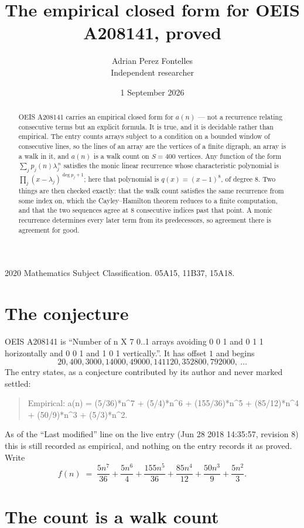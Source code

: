 \documentclass[11pt,a4paper]{article}
\title{The empirical closed form for OEIS A208141, proved}
\author{Adrian Perez Fontelles\\ \small Independent researcher}
\date{1 September 2026}
\theoremstyle{plain}
\theoremstyle{definition}
\begin{document}
\maketitle

\begin{abstract}
OEIS A208141 carries an empirical closed form for $a(n)$ --- not a recurrence relating
consecutive terms but an explicit formula. It is true, and it is decidable rather than
empirical. The entry counts arrays subject to a condition on a bounded window of consecutive lines, so the lines of an array are the
vertices of a finite digraph, an array is a walk in it, and $a(n)$ is a walk count on
$S=400$ vertices. Any function of the form $\sum_j p_j(n)\lambda_j^{\,n}$ satisfies the
monic linear recurrence whose characteristic polynomial is
$\prod_j(x-\lambda_j)^{\deg p_j+1}$; here that polynomial is $q(x)=(x-1)^{8}$, of degree
$8$. Two things are then checked exactly: that the walk count satisfies the same
recurrence from some index on, which the Cayley--Hamilton theorem reduces to a finite
computation, and that the two sequences agree at $8$ consecutive indices past that
point. A monic recurrence determines every later term from its predecessors, so agreement
there is agreement for good.
\end{abstract}

\noindent\small 2020 Mathematics Subject Classification. 05A15, 11B37, 15A18.\normalsize

\section{The conjecture}

OEIS A208141 is ``Number of n X 7 0..1 arrays avoiding 0 0 1 and 0 1 1 horizontally and 0 0 1 and 1 0 1 vertically.''. It has offset $1$ and begins
\[
20, 400, 3000, 14000, 49000, 141120, 352800, 792000,\ \dots
\]
The entry states, as a conjecture contributed by its author and never marked settled:
\begin{quote}
Empirical: a(n) = (5/36)*n\^{}7 + (5/4)*n\^{}6 + (155/36)*n\^{}5 + (85/12)*n\^{}4 + (50/9)*n\^{}3 + (5/3)*n\^{}2.
\end{quote}
As of the ``Last modified'' line on the live entry (Jun 28 2018 14:35:57, revision 8) this is still
recorded as empirical, and nothing on the entry records it as proved. Write
\[
f(n)\;=\;\frac{5 n^{7}}{36} + \frac{5 n^{6}}{4} + \frac{155 n^{5}}{36} + \frac{85 n^{4}}{12} + \frac{50 n^{3}}{9} + \frac{5 n^{2}}{3}.
\]

\section{The count is a walk count}
\end{document}

